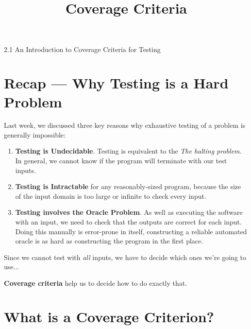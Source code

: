 



\title{Coverage Criteria}{2.1 An Introduction to Coverage Criteria for Testing}

\section{Recap --- Why Testing is a Hard Problem}


Last week, we discussed three key reasons why exhaustive testing of a problem is
generally impossible:


\begin{enumerate}


    \item {\bf Testing is Undecidable}. Testing is equivalent to the
    {\it The halting problem}. In general, we cannot know if the program will
    terminate with our test inputs.


    \item {\bf Testing is Intractable} for any reasonably-sized
    program, because the size of the input domain is too large or infinite to
    check every input.


    \item {\bf Testing involves the Oracle Problem}. As well as executing the
    software with an input, we need to check that the outputs are correct for
    each input. Doing this manually is error-prone in itself, constructing a
    reliable automated oracle is as hard as constructing the program in the
    first place.

\end{enumerate}

Since we cannot test with {\it all} inputs, we have to decide which ones we're
going to use... 

{\bf Coverage criteria} help us to decide how to do exactly that. 


\section{What is a Coverage Criterion?}

